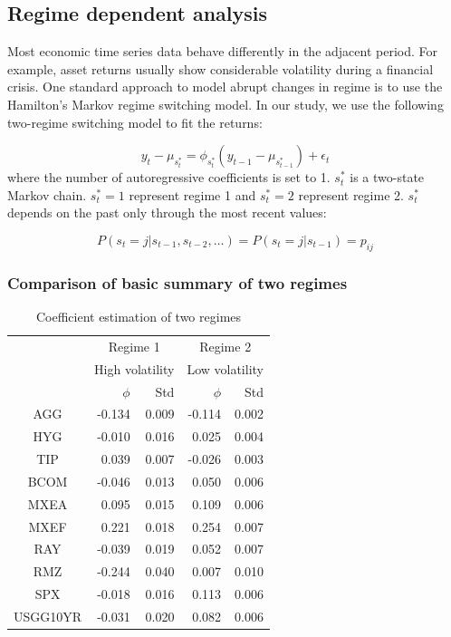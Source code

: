\documentclass[11pt]{article}
\begin{document}
\subsection{Regime dependent analysis}

Most economic time series data behave differently in the adjacent period. For example, asset returns
usually show considerable volatility during a financial crisis. One standard approach to model abrupt changes in regime is to use the Hamilton's Markov regime switching model\cite{hamilton1994time}\cite{hamilton1990analysis}. In our study, we use the following two-regime switching model to fit the returns:

\begin{equation}
y_t - \mu_{s^*_t} = \phi_{s^*_t} (y_{t-1} - \mu_{s^*_{t-1}}) + \epsilon_t
\end{equation}
where the number of autoregressive coefficients is set to 1. $s^*_t$ is a two-state Markov chain. $s^*_t = 1$ represent regime 1 and $s^*_t = 2$ represent regime 2. $s^*_t$ depends on the past only through the most recent values:

\begin{equation}
P(s_t = j|s_{t-1}, s_{t-2}, \dots) = P(s_t = j|s_{t-1})  = p_{ij}
\end{equation}

\subsubsection{Comparison of basic summary of two regimes}

\begin{table}
\centering 
\begin{tabular}{ | c || r r | r r | } 
    \hline
    & \multicolumn{2}{c|}{Regime 1}  & 
    \multicolumn{2}{c|}{Regime 2} \\
     & \multicolumn{2}{c|}{High volatility}  & 
    \multicolumn{2}{c|}{Low volatility} \\
    & $\phi$ & Std & $\phi$ &  Std \\
     \hline \hline
    AGG  & -0.134 & 0.009 & -0.114 & 0.002 \\ 
    HYG & -0.010 & 0.016 & 0.025 & 0.004 \\ 
    TIP &  0.039 & 0.007 & -0.026 & 0.003 \\ 
    BCOM & -0.046 & 0.013 & 0.050 & 0.006 \\ 
    MXEA & 0.095 & 0.015 & 0.109 & 0.006 \\ 
    MXEF & 0.221 & 0.018 & 0.254 & 0.007\\ 
    RAY& -0.039  & 0.019 & 0.052 & 0.007\\ 
    RMZ & -0.244 & 0.040 & 0.007 & 0.010\\ 
    SPX & -0.018 & 0.016 & 0.113 & 0.006\\ 
    USGG10YR & -0.031 & 0.020 & 0.082 & 0.006\\ 
    \hline
\end{tabular}
\caption{Coefficient estimation of two regimes} 
\label{table:autoCoeffRegime}
\end{table} 
\end{document}

